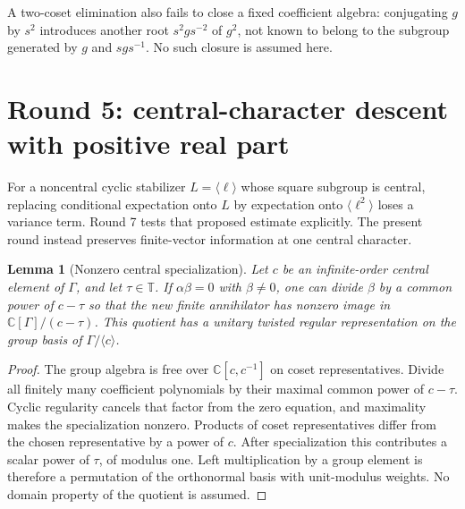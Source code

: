 \documentclass[11pt,a4paper,oneside]{report}
\newtheorem{lemma}[theorem]{Lemma}
\theoremstyle{definition}
\theoremstyle{remark}
\newcommand{\C}{\mathbb C}
\newcommand{\T}{\mathbb T}
\begin{document}
A two-coset elimination also fails to close a fixed coefficient
algebra: conjugating $g$ by $s^2$ introduces another root
$s^2gs^{-2}$ of $g^2$, not known to belong to the subgroup
generated by $g$ and $sgs^{-1}$. No such closure is assumed here.

\section{Round 5: central-character descent with positive real part}
For a noncentral cyclic stabilizer $L=\langle\ell\rangle$
whose square subgroup is central, replacing conditional expectation
onto $L$ by expectation onto $\langle\ell^2\rangle$ loses a
variance term. Round 7 tests that proposed estimate explicitly.
The present round instead preserves finite-vector information at
one central character.

\begin{lemma}[Nonzero central specialization]\label{M10:lem:character}
Let $c$ be an infinite-order central element of $\Gamma$, and
let $\tau\in\T$. If $\alpha\beta=0$ with $\beta\ne0$, one can
divide $\beta$ by a common power of $c-\tau$ so that the new
finite annihilator has nonzero image in
$\C[\Gamma]/(c-\tau)$.
This quotient has a unitary twisted regular representation on
the group basis of $\Gamma/\langle c\rangle$.
\end{lemma}
\begin{proof}
The group algebra is free over $\C[c,c^{-1}]$ on coset
representatives. Divide all finitely many coefficient polynomials
by their maximal common power of $c-\tau$. Cyclic regularity
cancels that factor from the zero equation, and maximality makes
the specialization nonzero. Products of coset representatives
differ from the chosen representative by a power of $c$.
After specialization this contributes a scalar power of $\tau$,
of modulus one. Left multiplication by a group element is
therefore a permutation of the orthonormal basis with unit-modulus
weights. No domain property of the quotient is assumed.
\end{proof}
\end{document}
